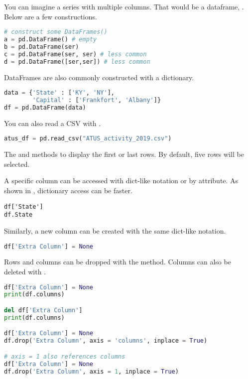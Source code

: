 You can imagine a series with multiple columns. That would be a dataframe, . Below are a few constructions.

\begin{lstlisting}[language = Python]
# construct some DataFrames()
a = pd.DataFrame() # empty
b = pd.DataFrame(ser)
c = pd.DataFrame(ser, ser) # less common
d = pd.DataFrame([ser,ser]) # less common
\end{lstlisting}


DataFrames are also commonly constructed with a dictionary. 

\begin{lstlisting}[language = Python]
data = {'State' : ['KY', 'NY'], 
        'Capital' : ['Frankfort', 'Albany']}
df = pd.DataFrame(data)
\end{lstlisting}

You can also read a CSV with . 
\begin{lstlisting}[language = Python]
atus_df = pd.read_csv("ATUS_activity_2019.csv")
\end{lstlisting}



The  and  methods to display the first or last rows. By default, five rows will be selected. 

\smallskip
\noindent A specific column can be accessed with dict-like notation or by attribute. As shown in \cite{antao2022},  dictionary access can be faster.

\begin{lstlisting}
df['State']
df.State
\end{lstlisting}

Similarly, a new column can be created with the same dict-like notation. 

\begin{lstlisting}[language = Python]
df['Extra Column'] = None
\end{lstlisting}


\smallskip
\noindent Rows and columns can be dropped with the  method. Columns can also be deleted with .

\begin{lstlisting}[language = Python]
df['Extra Column'] = None
print(df.columns)

del df['Extra Column']
print(df.columns)

df['Extra Column'] = None
df.drop('Extra Column', axis = 'columns', inplace = True)

# axis = 1 also references columns
df['Extra Column'] = None
df.drop('Extra Column', axis = 1, inplace = True)
\end{lstlisting}




